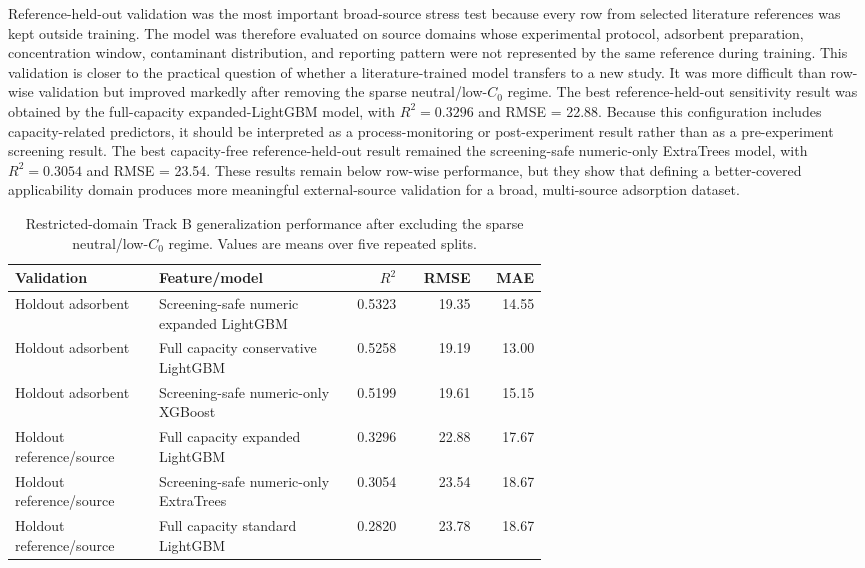 \documentclass[review,12pt,number]{elsarticle}
\begin{document}
Reference-held-out validation was the most important broad-source stress test because every row from selected literature references was kept outside training. The model was therefore evaluated on source domains whose experimental protocol, adsorbent preparation, concentration window, contaminant distribution, and reporting pattern were not represented by the same reference during training. This validation is closer to the practical question of whether a literature-trained model transfers to a new study. It was more difficult than row-wise validation but improved markedly after removing the sparse neutral/low-$C_0$ regime. The best reference-held-out sensitivity result was obtained by the full-capacity expanded-LightGBM model, with $R^2 = 0.3296$ and RMSE = 22.88. Because this configuration includes capacity-related predictors, it should be interpreted as a process-monitoring or post-experiment result rather than as a pre-experiment screening result. The best capacity-free reference-held-out result remained the screening-safe numeric-only ExtraTrees model, with $R^2 = 0.3054$ and RMSE = 23.54. These results remain below row-wise performance, but they show that defining a better-covered applicability domain produces more meaningful external-source validation for a broad, multi-source adsorption dataset.

\begin{table}[htbp]
\centering
\caption{Restricted-domain Track B generalization performance after excluding the sparse neutral/low-$C_0$ regime. Values are means over five repeated splits.}
\label{tab:trackb_group}
\small
\begin{tabular}{>{\raggedright\arraybackslash}p{0.27\linewidth}>{\raggedright\arraybackslash}p{0.35\linewidth}rrr}
\toprule
Validation & Feature/model & $R^2$ & RMSE & MAE \\
\midrule
Holdout adsorbent & Screening-safe numeric expanded LightGBM & 0.5323 & 19.35 & 14.55 \\
Holdout adsorbent & Full capacity conservative LightGBM & 0.5258 & 19.19 & 13.00 \\
Holdout adsorbent & Screening-safe numeric-only XGBoost & 0.5199 & 19.61 & 15.15 \\
Holdout reference/source & Full capacity expanded LightGBM & 0.3296 & 22.88 & 17.67 \\
Holdout reference/source & Screening-safe numeric-only ExtraTrees & 0.3054 & 23.54 & 18.67 \\
Holdout reference/source & Full capacity standard LightGBM & 0.2820 & 23.78 & 18.67 \\
\bottomrule
\end{tabular}
\end{table}
\end{document}
